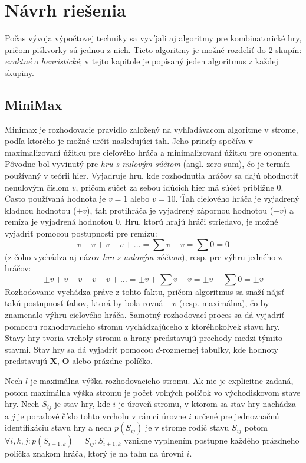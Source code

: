 \section{Návrh riešenia}\label{sec:algorithms}

Počas vývoja výpočtovej techniky sa vyvíjali aj algoritmy pre kombinatorické hry, pričom piškvorky sú jednou z nich.
Tieto algoritmy je možné rozdeliť do 2 skupín: \emph{exaktné} a \emph{heuristické}; v tejto kapitole je popísaný jeden
algoritmus z každej skupiny.

\subsection{MiniMax}\label{subsec:algo-minmax}

Minimax je rozhodovacie pravidlo založený na vyhľadávacom algoritme v strome, podľa ktorého je možné určiť nasledujúci
ťah.\cite{algo_minimax}
Jeho princíp spočíva v maximalizovaní úžitku pre cieľového hráča a minimalizovaní úžitku pre oponenta.
Pôvodne bol vyvinutý pre \emph{hru s nulovým súčtom} (angl. zero-sum), čo je termín používaný v teórii hier.
Vyjadruje hru, kde rozhodnutia hráčov sa dajú ohodnotiť nenulovým číslom $v$, pričom súčet za sebou idúcich hier má
súčet približne 0.
Často používaná hodnota je $v=1$ alebo $v=10$.
Ťah cieľového hráča je vyjadrený kladnou hodnotou ($+v$), ťah protihráča je vyjadrený zápornou hodnotou ($-v$) a remíza
je vyjadrená hodnotou $0$.
Hru, ktorú hrajú hráči striedavo, je možné vyjadriť pomocou postupnosti pre remízu:
\begin{equation}
    v-v+v-v+ \dots = \sum{v-v} = \sum{0} = 0
\end{equation}
(z čoho vychádza aj názov \emph{hra s nulovým súčtom}), resp. pre výhru jedného z hráčov:
\begin{equation}
    \pm v+v-v+v-v+ \dots = \pm v+\sum{v-v} = \pm v+\sum{0} = \pm v
\end{equation}
Rozhodovanie vychádza práve z tohto faktu, pričom algoritmus sa snaží nájsť takú postupnosť ťahov, ktorá by bola rovná
$+v$ (resp. maximálna), čo by znamenalo výhru cieľového hráča.
Samotný rozhodovací proces sa dá vyjadriť pomocou rozhodovacieho stromu vychádzajúceho z ktoréhokoľvek stavu hry.
Stavy hry tvoria vrcholy stromu a hrany predstavujú prechody medzi týmito stavmi.
Stav hry sa dá vyjadriť pomocou $d$-rozmernej tabuľky, kde hodnoty predstavujú \textbf{X}, \textbf{O} alebo prázdne
políčko.

Nech $l$ je maximálna výška rozhodovacieho stromu.
Ak nie je explicitne zadaná, potom maximálna výška stromu je počet voľných políčok vo východiskovom stave hry.
Nech $S_{ij}$ je stav hry, kde $i$ je úroveň stromu, v ktorom sa stav hry nachádza a $j$ je poradové číslo tohto vrcholu
v rámci úrovne $i$ určené pre jednoznačnú identifikáciu stavu hry a nech $p(S_{ij})$ je v strome rodič stavu $S_{ij}$
potom $\forall i, k, j \colon p(S_{i+1,k}) = S_{ij} \colon S_{i+1,k}$ vznikne vyplnením postupne každého
prázdneho políčka znakom hráča, ktorý je na ťahu na úrovni $i$.

